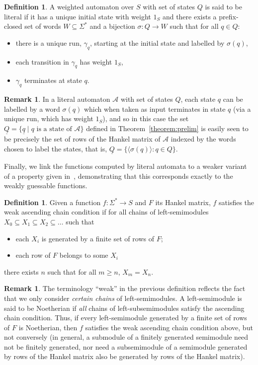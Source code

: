 \documentclass[10pt,a4paper]{amsart}
\theoremstyle{definition}
\newtheorem{rem}[thm]{Remark}
\newtheorem{defi}[thm]{Definition}
\numberwithin{equation}{section}
\numberwithin{theorem}{section}
\begin{document}
\begin{defi}
\label{definition:literal}
A weighted automaton over $S$ with set of states $Q$ is said to be literal if it has a unique initial state with weight $1_S$ and there exists a prefix-closed set of words $W \subseteq \Sigma^*$ and a bijection $\sigma: Q \rightarrow W$ such that for all $q \in Q$:
	\begin{itemize}
		\item there is a unique run, $\gamma_q$, starting at the initial state and labelled by $\sigma(q)$,
		\item each transition in $\gamma_q$ has weight $1_S$,
		\item $\gamma_q$ terminates at state $q$.
	\end{itemize}
\end{defi}
\begin{rem}
\label{rem:litrows}
In a literal automaton $\mathcal{A}$ with set of states $Q$, each state $q$ can be labelled by a word $\sigma(q)$ which when taken as input terminates in  state $q$ (via a unique run, which has weight $1_S$), and so in this case the set $\underline{Q} = \{\underline{q}  \mid q \text{ is a state of } \mathcal{A}\}$ defined in Theorem~\ref{theorem:prelim} is easily seen to be precisely the set of rows of the Hankel matrix of $\mathcal{A}$ indexed by the words chosen to label the states, that is, $\underline{Q} = \{\langle \sigma(q) \rangle: q \in Q\}$.
\end{rem}

Finally, we link the functions computed by literal automata to a weaker variant of a property given in~\cite{HKRS20}, demonstrating that this corresponds exactly to the weakly guessable functions.

\begin{defi}
\label{definition:wacc}
Given a function $f:\Sigma^* \to S$ and $F$ its Hankel matrix, $f$ satisfies the weak ascending chain condition if for all chains of left-semimodules  $X_0 \subseteq X_1 \subseteq X_2 \subseteq \ldots $ such that
\begin{itemize}
    \item each $X_i$ is generated by a finite set of rows of $F$;
    \item each row of $F$ belongs to some $X_i$
\end{itemize}
there exists $n$ such that for all $m \geq n$, $X_m = X_n$.
\end{defi}

\begin{rem}
\label{rem:Noetherian}
The terminology ``weak'' in the previous definition reflects the fact that we only consider \emph{certain chains} of left-semimodules. A left-semimodule is said to be Noetherian if \emph{all} chains of left-subsemimodules satisfy the ascending chain condition.  Thus, if every left-semimodule generated by a finite set of rows of $F$ is Noetherian, then $f$ satisfies the weak ascending chain condition above, but not conversely (in general, a submodule of a finitely generated semimodule need not be finitely generated, nor need a subsemimodule of a semimodule generated by rows of the Hankel matrix also be generated by rows of the Hankel matrix).	
\end{rem}
\end{document}
